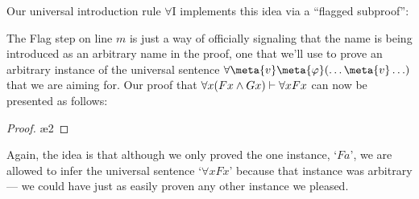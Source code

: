 Our universal introduction rule $\forall$I implements this idea via a ``flagged subproof'':

The Flag step on line $m$ is just a way of officially signaling that the name  is being introduced as an arbitrary name in the proof, one that we'll use to prove an arbitrary instance of the universal sentence $\forall \meta{v}\meta{\varphi}(\ldots \meta{v} \ldots)$ that we are aiming for.  Our proof that $\forall x (Fx \wedge Gx) \vdash \forall x Fx$ can now be presented as follows:

\begin{proof}
	 
	\open
	 \fl{}
	 
	 \ae{2}
	\close
	 
\end{proof}
Again, the idea is that although we only proved the one instance, `$Fa$', we are allowed to infer the universal sentence `$\forall xFx$' because that instance was arbitrary --- we could have just as easily proven any other instance we pleased.


